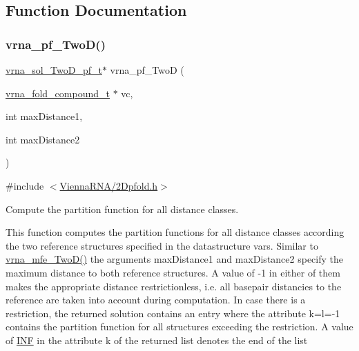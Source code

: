 \subsection{Function Documentation}
\mbox{\label{group__kl__neighborhood__pf_ga0bc3427689bd09da09b8b3094a27f836}} 
\subsubsection{\texorpdfstring{vrna\+\_\+pf\+\_\+\+Two\+D()}{vrna\_pf\_TwoD()}}
{\footnotesize\ttfamily \hyperlink{group__kl__neighborhood__pf_structvrna__sol__TwoD__pf__t}{vrna\+\_\+sol\+\_\+\+Two\+D\+\_\+pf\+\_\+t}$\ast$ vrna\+\_\+pf\+\_\+\+TwoD (\begin{DoxyParamCaption}\item[{\hyperlink{group__fold__compound_ga1b0cef17fd40466cef5968eaeeff6166}{vrna\+\_\+fold\+\_\+compound\+\_\+t} $\ast$}]{vc,  }\item[{int}]{max\+Distance1,  }\item[{int}]{max\+Distance2 }\end{DoxyParamCaption})}



{\ttfamily \#include $<$\hyperlink{2Dpfold_8h}{Vienna\+R\+N\+A/2\+Dpfold.\+h}$>$}



Compute the partition function for all distance classes. 

This function computes the partition functions for all distance classes according the two reference structures specified in the datastructure \textquotesingle{}vars\textquotesingle{}. Similar to \hyperlink{group__kl__neighborhood__mfe_ga243c288b463147352829df04de6a2f77}{vrna\+\_\+mfe\+\_\+\+Two\+D()} the arguments max\+Distance1 and max\+Distance2 specify the maximum distance to both reference structures. A value of \textquotesingle{}-\/1\textquotesingle{} in either of them makes the appropriate distance restrictionless, i.\+e. all basepair distancies to the reference are taken into account during computation. In case there is a restriction, the returned solution contains an entry where the attribute k=l=-\/1 contains the partition function for all structures exceeding the restriction. A value of \hyperlink{energy__const_8h_a12c2040f25d8e3a7b9e1c2024c618cb6}{I\+NF} in the attribute \textquotesingle{}k\textquotesingle{} of the returned list denotes the end of the list

